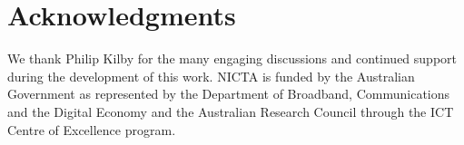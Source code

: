 \section{Acknowledgments}
We thank Philip Kilby for the many engaging discussions and continued support during 
the development of this work.
NICTA is funded by the Australian Government as represented by the Department of 
Broadband, Communications and the Digital Economy and the Australian Research 
Council through the ICT Centre of Excellence program.

